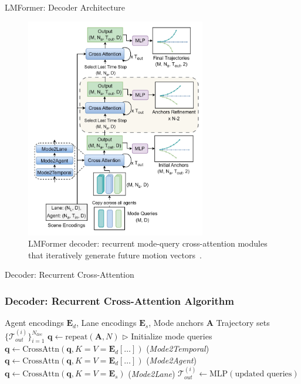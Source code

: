\documentclass[10pt,aspectratio=169]{beamer}
\begin{document}
\begin{frame}{LMFormer: Decoder Architecture}
    \begin{figure}
        \centering
        \includegraphics[width=0.7\textwidth]{docs/figures/lmformer_arch_decoder.png}
        \caption{LMFormer decoder: recurrent mode-query cross-attention modules that iteratively generate future motion vectors~\cite{lmformerYadav2025}.}
    \end{figure}
\end{frame}

\begin{frame}[fragile]{Decoder: Recurrent Cross-Attention}
    \frametitle{Decoder: Recurrent Cross-Attention Algorithm}
    \begin{algorithmic}[1]
    \scriptsize
    \Require Agent encodings \(\mathbf{E}_d\), Lane encodings \(\mathbf{E}_s\), Mode anchors \(\mathbf{A}\)
    \Ensure Trajectory sets \(\{\mathcal{T}_{out}^{(i)}\}_{i=1}^{N_{\text{dec}}}\)
    \State \(\mathbf{q} \leftarrow \text{repeat}(\mathbf{A}, N)\) \(\triangleright\) Initialize mode queries
            \State \(\mathbf{q}\leftarrow \text{CrossAttn}(\mathbf{q}, K=V=\mathbf{E}_d[\dots])\) \quad (\textit{Mode2Temporal})
            \State \(\mathbf{q}\leftarrow \text{CrossAttn}(\mathbf{q}, K=V=\mathbf{E}_d[\dots])\) \quad (\textit{Mode2Agent})
            \State \(\mathbf{q}\leftarrow \text{CrossAttn}(\mathbf{q}, K=V=\mathbf{E}_s)\) \quad (\textit{Mode2Lane})
        \EndFor
        \State \(\mathcal{T}_{out}^{(i)} \leftarrow \text{MLP}(\text{updated queries})\)
    \EndFor
    \end{algorithmic}
\end{frame}
\end{document}
